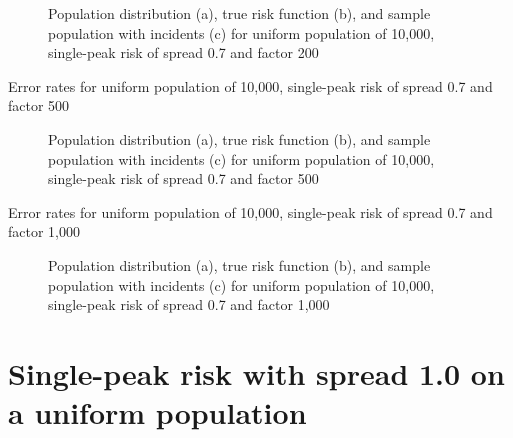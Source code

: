 {\begin{figure}[H]
    
    \caption[]{Population distribution (a), true risk function (b), and sample population with incidents (c) for uniform population of 10,000, single-peak risk of \gls{spread} 0.7 and \gls{factor} 200}
    \label{fig:distributions:unif_200_0.7_1h}    
\end{figure} \newpage



\begin{table}[H]

\caption[]{Error rates for uniform population of 10,000, single-peak risk of \gls{spread} 0.7 and \gls{factor} 500}
\label{tab:mean_error_rates:unif_500_0.7_1h}
\end{table}

\begin{figure}[H]
    
    \caption[]{Population distribution (a), true risk function (b), and sample population with incidents (c) for uniform population of 10,000, single-peak risk of \gls{spread} 0.7 and \gls{factor} 500}
    \label{fig:distributions:unif_500_0.7_1h}    
\end{figure} \newpage



\begin{table}[H]

\caption[]{Error rates for uniform population of 10,000, single-peak risk of \gls{spread} 0.7 and \gls{factor} 1,000}
\label{tab:mean_error_rates:unif_1000_0.7_1h}
\end{table}

\begin{figure}[H]
    
    \caption[]{Population distribution (a), true risk function (b), and sample population with incidents (c) for uniform population of 10,000, single-peak risk of \gls{spread} 0.7 and \gls{factor} 1,000}
    \label{fig:distributions:unif_1000_0.7_1h}    
\end{figure} \newpage

\section{Single-peak risk with spread 1.0 on a uniform population}
\label{sec:app:results_unif_1.0_1h}

}
